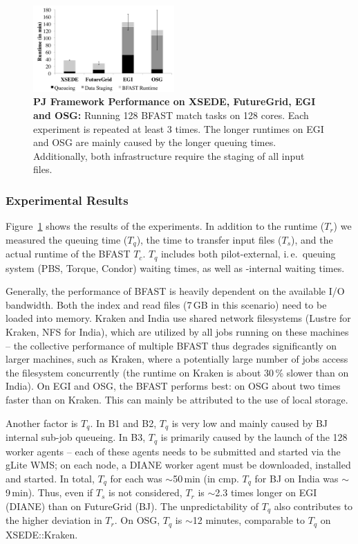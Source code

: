 \documentclass{sig-alternate}
\begin{document}
\begin{figure}[t]
 \centering
 \includegraphics[width=0.48\textwidth]{perf/interop/128-bfast-egi-fg-xsede-osg.pdf}
 \caption{\textbf{PJ Framework Performance on XSEDE, FutureGrid, EGI and 
  OSG:} Running 128 BFAST match tasks on 128 cores. Each experiment is
  repeated at least 3 times. The longer runtimes on EGI and OSG are
  mainly caused by the longer queuing times. Additionally, 
	both infrastructure require the staging of all input files. }
	\label{fig:perf_perf-bfast-bj}
\end{figure}


\subsubsection*{Experimental Results}

Figure~\ref{fig:perf_perf-bfast-bj} shows the results of the
experiments. In addition to the runtime ($T_r$) we measured the
queuing time ($T_q$), the time to transfer input files ($T_s$), and
the actual runtime of the BFAST \cu $T_c$. $T_q$ includes both
pilot-external, i.\,e.\ queuing system (PBS, Torque, Condor) waiting
times, as well as \pilot-internal waiting times.

Generally, the performance of BFAST is heavily dependent on the
available I/O bandwidth. Both the index and read files (7\,GB in this
scenario) need to be loaded into memory.  Kraken and India use
shared network filesystems (Lustre for Kraken, NFS for India), which
are utilized by all jobs running on these machines -- the collective
performance of multiple BFAST \cu thus degrades significantly on
larger machines, such as Kraken, where a potentially large number of
jobs access the filesystem concurrently (the runtime on Kraken is
about 30\,\% slower than on India).  On EGI and OSG, the BFAST \cu
performs best: on OSG about two times faster than on Kraken. This can
mainly be attributed to the use of local storage.

Another factor is $T_q$. In B1 and B2, $T_q$ is very low and mainly
caused by BJ internal sub-job queueing. In B3, $T_q$ is primarily
caused by the launch of the 128 worker agents -- each of these agents
needs to be submitted and started via the gLite WMS; on each node, a
DIANE worker agent must be downloaded, installed and started. In
total, $T_q$ for each \cu was $\sim$50\,min (in cmp. $T_q$ for BJ on
India was $\sim$9\,min). Thus, even if $T_s$ is not considered, $T_r$
is $\sim$2.3 times longer on EGI (DIANE) than on FutureGrid (BJ). The
unpredictability of $T_q$ also contributes to the higher deviation in
$T_r$. On OSG, $T_q$ is $\sim$12 minutes, comparable to $T_q$ on
XSEDE::Kraken.
\end{document}
